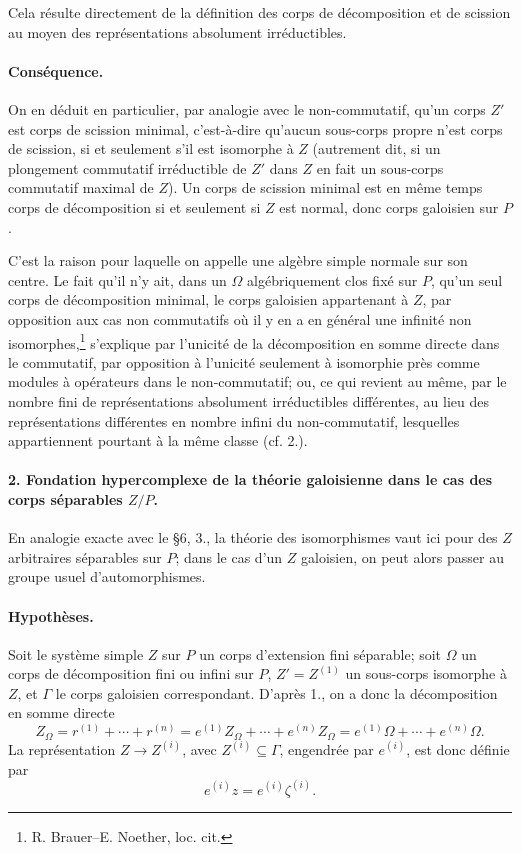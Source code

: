 Cela résulte directement de la définition des corps de décomposition et de scission au moyen des représentations absolument irréductibles. \paragraph{Conséquence.}
On en déduit en particulier, par analogie avec le non-commutatif, qu'un corps \(Z'\) est corps de scission minimal, c'est-à-dire qu'aucun sous-corps propre n'est corps de scission, si et seulement s'il est isomorphe à \(Z\) (autrement dit, si un plongement commutatif irréductible de \(Z'\) dans \(Z\) en fait un sous-corps commutatif maximal de \(Z\)). Un corps de scission minimal est en même temps corps de décomposition si et seulement si \(Z\) est normal, donc corps galoisien sur \(P\).

C'est la raison pour laquelle on appelle une algèbre simple normale sur son centre. Le fait qu'il n'y ait, dans un \(\Omega\) algébriquement clos fixé sur \(P\), qu'un seul corps de décomposition minimal, le corps galoisien appartenant à \(Z\), par opposition aux cas non commutatifs où il y en a en général une infinité non isomorphes,\footnote{R. Brauer--E. Noether, loc. cit.} s'explique par l'unicité de la décomposition en somme directe dans le commutatif, par opposition à l'unicité seulement à isomorphie près comme modules à opérateurs dans le non-commutatif; ou, ce qui revient au même, par le nombre fini de représentations absolument irréductibles différentes, au lieu des représentations différentes en nombre infini du non-commutatif, lesquelles appartiennent pourtant à la même classe (cf. 2.).

\paragraph{2. Fondation hypercomplexe de la théorie galoisienne dans le cas des corps séparables \(Z/P\).}
En analogie exacte avec le \S 6, 3., la théorie des isomorphismes vaut ici pour des \(Z\) arbitraires séparables sur \(P\); dans le cas d'un \(Z\) galoisien, on peut alors passer au groupe usuel d'automorphismes.

\paragraph{Hypothèses.}
Soit le système simple \(Z\) sur \(P\) un corps d'extension fini séparable; soit \(\Omega\) un corps de décomposition fini ou infini sur \(P\), \(Z'=Z^{(1)}\) un sous-corps isomorphe à \(Z\), et \(\Gamma\) le corps galoisien correspondant. D'après 1., on a donc la décomposition en somme directe
\[
        Z_\Omega=r^{(1)}+\cdots+r^{(n)}
        =e^{(1)}Z_\Omega+\cdots+e^{(n)}Z_\Omega
        =e^{(1)}\Omega+\cdots+e^{(n)}\Omega .
\]
La représentation \(Z\to Z^{(i)}\), avec \(Z^{(i)}\subseteq\Gamma\), engendrée par \(e^{(i)}\), est donc définie par
\[
        e^{(i)}z=e^{(i)}\zeta^{(i)}.
\]

